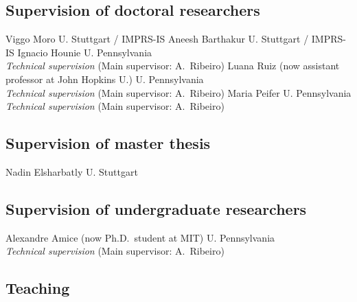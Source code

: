 \documentclass{cvlfoc}
\begin{document}
\subsection*{Supervision of doctoral researchers}

\begin{entrydate}
		{Viggo Moro \hfill U. Stuttgart / IMPRS-IS}
		{Aneesh Barthakur \hfill U. Stuttgart / IMPRS-IS}
		{Ignacio Hounie \hfill U. Pennsylvania\\
			\emph{Technical supervision} \hfill(Main supervisor: A.\ Ribeiro)}
		{Luana Ruiz {\small (now assistant professor at John Hopkins U.)}
			\hfill U. Pennsylvania\\
			\emph{Technical supervision} \hfill(Main supervisor: A.\ Ribeiro)}
		{Maria Peifer \hfill U. Pennsylvania\\
			\emph{Technical supervision} \hfill(Main supervisor: A.\ Ribeiro)}
\end{entrydate}


\subsection*{Supervision of master thesis}

\begin{entrydate}
		{Nadin Elsharbatly \hfill U. Stuttgart}
\end{entrydate}


\subsection*{Supervision of undergraduate researchers}

\begin{entrydate}
		{Alexandre Amice {\small (now Ph.D.\ student at MIT)}
		\hfill U. Pennsylvania\\
		\emph{Technical supervision} \hfill(Main supervisor: A.\ Ribeiro)}
\end{entrydate}


\subsection*{Teaching}
\end{document}
